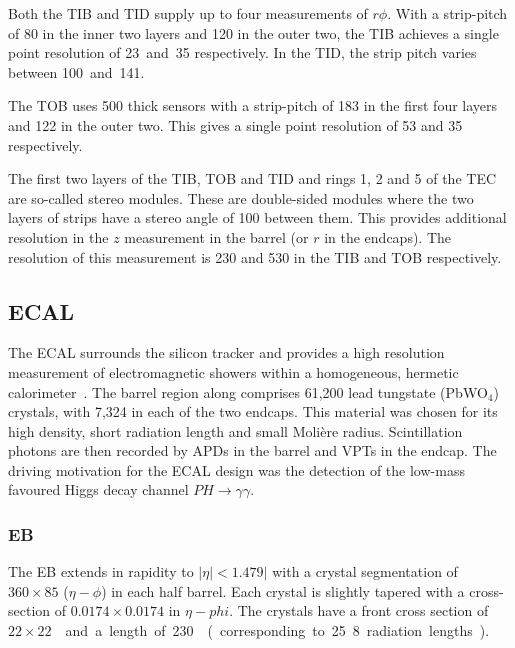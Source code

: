 Both the \ac{TIB} and \ac{TID} supply up to four measurements of $r\phi$. With a
strip-pitch of \unit{80}{\micro\metre} in the inner two layers and
\unit{120}{\micro\metre} in the outer two, the \ac{TIB} achieves a single point
resolution of \unit{23 and 35}{\micro\metre} respectively. In the \ac{TID}, the
strip pitch varies between \unit{100 and 141}{\micro\metre}.

The \ac{TOB} uses \unit{500}{\micro\metre} thick sensors with a strip-pitch of
\unit{183}{\micro\metre} in the first four layers and \unit{122}{\micro\metre} in
the outer two. This gives a single point resolution of \unit{53}{\micro\metre}
and \unit{35}{\micro\metre} respectively.

The first two layers of the \ac{TIB}, \ac{TOB} and \ac{TID} and rings 1, 2 and 5
of the \ac{TEC} are so-called stereo modules. These are double-sided modules
where the two layers of strips have a stereo angle of \unit{100}{\milli\radian}
between them. This provides additional resolution in the $z$ measurement in the
barrel (or $r$ in the endcaps). The resolution of this measurement is
\unit{230}{\micro\metre} and \unit{530}{\micro\metre} in the \ac{TIB} and
\ac{TOB} respectively.



\subsection{\acl{ECAL}}
The \ac{ECAL} surrounds the silicon tracker and provides a high resolution
measurement of electromagnetic showers within a homogeneous, hermetic
calorimeter~\cite{ecal_paper}. The barrel region along comprises 61,200 lead
tungstate (PbWO$_4$) crystals, with 7,324 in each of the two endcaps. This
material was chosen for its high density, short radiation length and small
Moli\`{e}re radius. Scintillation photons are then recorded by \ac{APD}s in the
barrel and \ac{VPT}s in the endcap. The driving motivation for the \ac{ECAL}
design was the detection of the low-mass favoured Higgs decay channel
$PH\longrightarrow\gamma\gamma$.

\subsubsection{\acl{EB}}
The \ac{EB} extends in rapidity to $|\eta|<1.479|$ with a crystal
segmentation of $360\times 85$ ($\eta-\phi$) in each half barrel. Each crystal
is slightly tapered with a cross-section of $0.0174\times0.0174$ in
$\eta-phi$. The crystals have a front cross section of \unit{$22\times
  22$}{\milli\metre\squared} and a length of \unit{230}{\milli\metre}
(corresponding to 25.8 radiation lengths).

